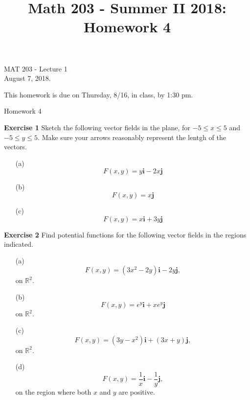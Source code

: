 \documentclass[12pt,oneside]{exam}
\title{Math 203 - Summer II 2018: Homework 4}
\newenvironment{exercise}[1]{\vspace{.1in}\noindent\textbf{Exercise #1 \hspace{.05em}}}{}
\begin{document}
\begin{flushright}
\sc MAT 203 - Lecture 1\\
August 7, 2018.
\end{flushright}
\bigskip

This homework is due on Thursday, 8/16, in class, by 1:30 pm. 
\begin{center}
\textsf{Homework 4} 
\end{center}

\begin{exercise}{1}
Sketch the following vector fields in the plane, for $-5 \leq x \leq 5$ and $-5 \leq y \leq 5$. Make sure your arrows reasonably represent the lentgh of the vectors. 

\begin{itemize}
\item[(a)] 
\begin{equation*}
F(x,y) = y\textbf{i} -2x\textbf{j}
\end{equation*}
\item[(b)] 
\begin{equation*}
F(x,y)= x\textbf{j}
\end{equation*}
\item[(c)] 
\begin{equation*}
F(x,y)=x\textbf{i}+3y\textbf{j}
\end{equation*}
\end{itemize}
\end{exercise}

\begin{exercise}{2} 
Find potential functions for the following vector fields in the regions indicated.  
\begin{itemize}
\item[(a)] 
\begin{equation*}
F(x,y)= (3x^2-2y)\textbf{i} -2y\textbf{j},
\end{equation*}
on $\mathbb{R}^2$.
\item[(b)] 
\begin{equation*}
F(x,y)= e^{y}\textbf{i} + xe^{y}\textbf{j}
\end{equation*}
on $\mathbb{R}^2$. 
\item[(c)]
\begin{equation*}
F(x,y)= (3y-x^2)\textbf{i}+ (3x+y)\textbf{j},
\end{equation*}
on $\mathbb{R}^2$. 
\item[(d)] 
\begin{equation*}
F(x,y)=\frac{1}{x}\textbf{i}-\frac{1}{y}\textbf{j}, 
\end{equation*}
on the region where both $x$ and $y$ are positive. 
\end{itemize}
\end{exercise}
\end{document}
